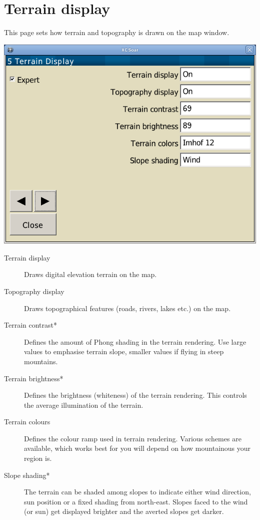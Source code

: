 \clearpage
\section{Terrain display}\label{sec:terrain-display}

This page sets how terrain and topography is drawn on the map window.

\begin{center}
\includegraphics[angle=0,width=0.8\linewidth,keepaspectratio='true']{figures/config-terrain.png}
\end{center}

\begin{description}
\item[Terrain display]  Draws digital elevation terrain on the map.
\item[Topography display]  Draws topographical features (roads, rivers, lakes etc.) on
 the map.
\item[Terrain contrast*]  Defines the amount of Phong shading in the terrain rendering. 
 Use large values to emphasise terrain slope, smaller values if flying in steep mountains.
\item[Terrain brightness*]  Defines the brightness (whiteness) of the terrain rendering. 
 This controls the average illumination of the terrain.
\item[Terrain colours]  Defines the colour ramp used in terrain rendering.  Various 
 schemes are available, which works best for you will depend on how mountainous your region is.
\item[Slope shading*]  \label{conf:shading} The terrain can be shaded among slopes 
 to indicate either wind direction, sun position or a fixed shading from north-east. 
 Slopes faced to the wind (or sun) get displayed brighter and the averted slopes get darker.
\end{description}


